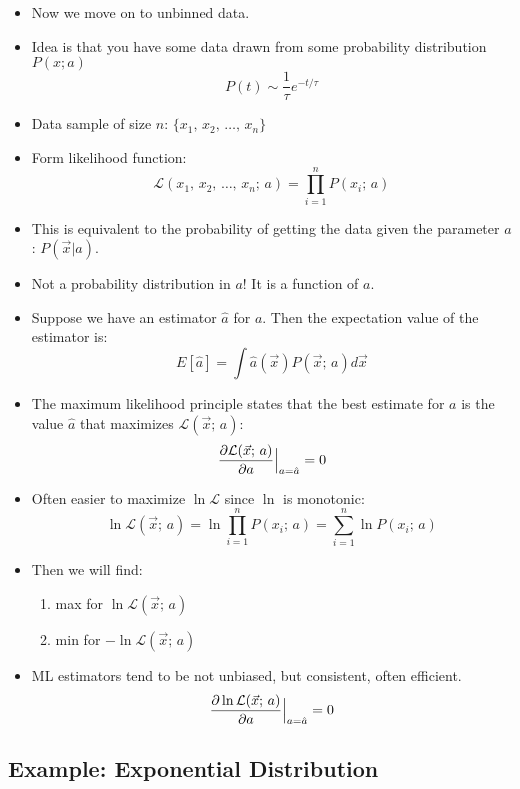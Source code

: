 \begin{itemize}
      \item Now we move on to unbinned data.
      \item Idea is that you have some data drawn from some probability distribution $P(x;a)$
            \[ P(t) \sim \frac{1}{\tau} e^{-t/\tau} \]
      \item Data sample of size $n$: $\{x_1, \, x_2, \, \ldots, \, x_n\}$
      \item Form likelihood function:
            \[ \mathcal{L}(x_1, \, x_2, \, \ldots, \, x_n; \, a) = \prod_{i=1}^n P(x_i; \, a) \]
      \item This is equivalent to the probability of getting the data given the parameter $a$: $P(\vec{x} | a)$.
      \item Not a probability distribution in $a$! It is a function of $a$.
      \item Suppose we have an estimator $\hat{a}$ for $a$. Then the expectation value of the estimator is:
            \[ E[\hat{a}] = \int \hat{a}(\vec{x}) P(\vec{x}; \, a) d\vec{x} \]
      \item The maximum likelihood principle states that the best estimate for $a$ is the value $\hat{a}$ that maximizes $\mathcal{L}(\vec{x}; \, a)$:
            \[ \pdv{\mathcal{L}(\vec{x}; \, a)}{a} \Big|_{a = \hat{a}} = 0 \]
      \item Often easier to maximize $\ln \mathcal{L}$ since $\ln$ is monotonic:
            \[ \ln \mathcal{L}(\vec{x}; \, a) = \ln{ \prod_{i=1}^n P(x_i; \, a)} = \sum_{i=1}^n \ln P(x_i; \, a) \]
      \item Then we will find:
            \begin{enumerate}
                  \item max for $\ln \mathcal{L}(\vec{x}; \, a)$
                  \item min for $- \ln \mathcal{L}(\vec{x}; \, a)$
            \end{enumerate}
      \item ML estimators tend to be not unbiased, but consistent, often efficient.
            \[ \pdv{\ln \mathcal{L}(\vec{x}; \, a)}{a} \Big|_{a = \hat{a}} = 0 \]
\end{itemize}

\subsection{Example: Exponential Distribution}

